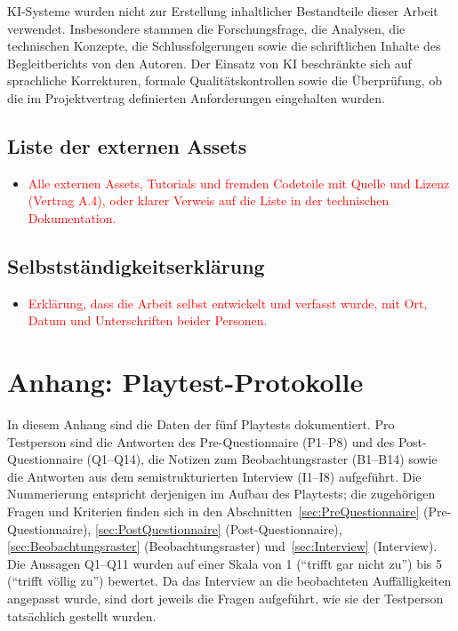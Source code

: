 \documentclass[../Main.tex]{subfiles}
\begin{document}
KI-Systeme wurden nicht zur Erstellung inhaltlicher Bestandteile dieser Arbeit verwendet. Insbesondere stammen die Forschungsfrage, die Analysen, die technischen Konzepte, die Schlussfolgerungen sowie die schriftlichen Inhalte des Begleitberichts von den Autoren. Der Einsatz von KI beschränkte sich auf sprachliche Korrekturen, formale Qualitätskontrollen sowie die Überprüfung, ob die im Projektvertrag definierten Anforderungen eingehalten wurden.

\subsection{Liste der externen Assets}

\begin{itemize}[leftmargin=1.5cm]
    \item \textcolor{red}{Alle externen Assets, Tutorials und fremden Codeteile mit Quelle und Lizenz (Vertrag A.4), oder klarer Verweis auf die Liste in der technischen Dokumentation.}
\end{itemize}

\subsection{Selbstständigkeitserklärung}

\begin{itemize}[leftmargin=1.5cm]
    \item \textcolor{red}{Erklärung, dass die Arbeit selbst entwickelt und verfasst wurde, mit Ort, Datum und Unterschriften beider Personen.}
\end{itemize}


\newpage
{}
\section{Anhang: Playtest-Protokolle} \label{sec:PlaytestProtokolle}

In diesem Anhang sind die Daten der fünf Playtests dokumentiert. Pro Testperson sind die Antworten des Pre-Questionnaire (P1--P8) und des Post-Questionnaire (Q1--Q14), die Notizen zum Beobachtungsraster (B1--B14) sowie die Antworten aus dem semistrukturierten Interview (I1--I8) aufgeführt. Die Nummerierung entspricht derjenigen im Aufbau des Playtests; die zugehörigen Fragen und Kriterien finden sich in den Abschnitten~\ref{sec:PreQuestionnaire} (Pre-Questionnaire), \ref{sec:PostQuestionnaire} (Post-Questionnaire), \ref{sec:Beobachtungsraster} (Beobachtungsraster) und~\ref{sec:Interview} (Interview). Die Aussagen Q1--Q11 wurden auf einer Skala von 1 (\enquote{trifft gar nicht zu}) bis 5 (\enquote{trifft völlig zu}) bewertet. Da das Interview an die beobachteten Auffälligkeiten angepasst wurde, sind dort jeweils die Fragen aufgeführt, wie sie der Testperson tatsächlich gestellt wurden.
\end{document}
